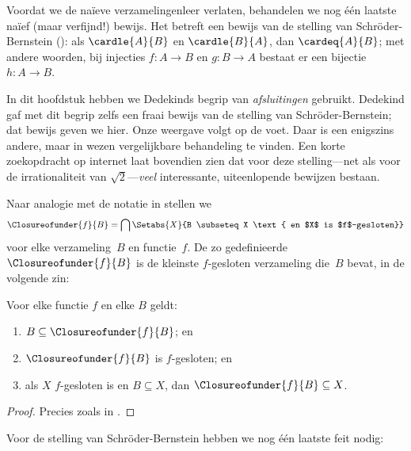 \documentclass[../../../include/open-logic-section]{subfiles}
\begin{document}


Voordat we de na\"ieve verzamelingenleer verlaten, behandelen we nog één
laatste na\"ief (maar verfijnd!) bewijs. Het betreft een bewijs van de
stelling van Schr\"oder-Bernstein
(): als
$\cardle{A}{B}$ en $\cardle{B}{A}$, dan $\cardeq{A}{B}$; met andere
woorden, bij injecties $f \colon A
\to B$ en $g \colon B \to A$ bestaat er een bijectie $h \colon A
\to B$.

In dit hoofdstuk hebben we Dedekinds begrip van \emph{afsluitingen}
gebruikt. Dedekind gaf met dit begrip zelfs een fraai bewijs van de
stelling van Schr\"oder-Bernstein; dat bewijs geven we hier. Onze
weergave volgt \citet[pp.~157--8]{Potter2004} op de voet. Daar is een
enigszins andere, maar in wezen vergelijkbare behandeling te vinden.
Een korte zoekopdracht op internet laat bovendien zien dat voor deze
stelling---net als voor de irrationaliteit van $\sqrt{2}$---\emph{veel}
interessante, uiteenlopende bewijzen bestaan.

Naar analogie met de notatie in
 stellen we
\[
\Closureofunder{f}{B} = \bigcap \Setabs{X}{B \subseteq X
\text{ en $X$ is $f$-gesloten}}
\]
voor elke verzameling~$B$ en functie~$f$. De zo gedefinieerde
$\Closureofunder{f}{B}$ is de kleinste $f$-gesloten verzameling die~$B$
bevat, in de volgende zin:

\begin{lem}
	Voor elke functie $f$ en elke $B$ geldt:
	\begin{enumerate}
		\item{} $B \subseteq \Closureofunder{f}{B}$; en
		\item{} $\Closureofunder{f}{B}$ is $f$-gesloten; en
		\item{} als $X$ $f$-gesloten is en $B
		\subseteq X$, dan $\Closureofunder{f}{B} \subseteq X$.
	\end{enumerate}
\end{lem}

\begin{proof}
Precies zoals in .
\end{proof}

Voor de stelling van Schr\"oder-Bernstein hebben we nog één laatste feit
nodig:
\end{document}
